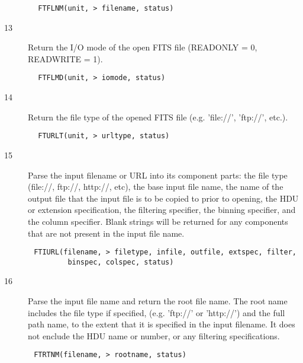 \documentclass[11pt]{book}
\begin{document}
\begin{verbatim}
        FTFLNM(unit, > filename, status)
\end{verbatim}

\begin{description}
\item[13] Return the I/O mode of the open FITS file (READONLY = 0, READWRITE = 1).
\end{description}

\begin{verbatim}
        FTFLMD(unit, > iomode, status)
\end{verbatim}

\begin{description}
\item[14] Return the file type of the opened FITS file (e.g. 'file://', 'ftp://',
  etc.).
\end{description}

\begin{verbatim}
        FTURLT(unit, > urltype, status)
\end{verbatim}

\begin{description}
\item[15]  Parse the input filename or URL into its component parts: the file
type (file://, ftp://, http://, etc), the base input file name, the
name of the output file that the input file is to be copied to prior
to opening, the HDU or extension specification, the filtering
specifier, the binning specifier, and the column specifier.  Blank
strings will be returned for any components that are not present
in the input file name.
\end{description}

\begin{verbatim}
       FTIURL(filename, > filetype, infile, outfile, extspec, filter,
               binspec, colspec, status)
\end{verbatim}

\begin{description}
\item[16] Parse the input file name and return the root file name.  The root
name includes the file type if specified, (e.g.  'ftp://' or 'http://')
and the full path name, to the extent that it is specified in the input
filename.  It does not enclude the HDU name or number, or any filtering
specifications.
\end{description}

\begin{verbatim}
       FTRTNM(filename, > rootname, status)
\end{verbatim}
\end{document}
